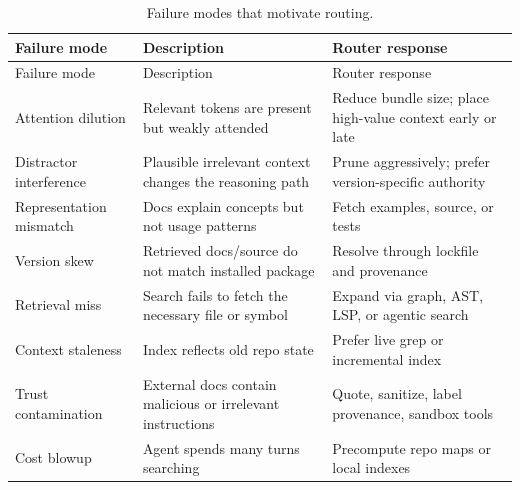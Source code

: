 \documentclass[
  11pt,
  letterpaper,
  numbers=noendperiod,
  parskip=half]{scrartcl}
\begin{document}
\begin{longtable}[]{@{}
  >{\raggedright\arraybackslash}p{}
  >{\raggedright\arraybackslash}p{}
  >{\raggedright\arraybackslash}p{}@{}}
\caption{Failure modes that motivate
routing.}\label{tbl-failure-modes}\tabularnewline
\toprule\noalign{}
\begin{minipage}[b]{\linewidth}\raggedright
Failure mode
\end{minipage} & \begin{minipage}[b]{\linewidth}\raggedright
Description
\end{minipage} & \begin{minipage}[b]{\linewidth}\raggedright
Router response
\end{minipage} \\
\midrule\noalign{}
\endfirsthead
\toprule\noalign{}
\begin{minipage}[b]{\linewidth}\raggedright
Failure mode
\end{minipage} & \begin{minipage}[b]{\linewidth}\raggedright
Description
\end{minipage} & \begin{minipage}[b]{\linewidth}\raggedright
Router response
\end{minipage} \\
\midrule\noalign{}
\endhead
\bottomrule\noalign{}
\endlastfoot
Attention dilution & Relevant tokens are present but weakly attended &
Reduce bundle size; place high-value context early or late \\
Distractor interference & Plausible irrelevant context changes the
reasoning path & Prune aggressively; prefer version-specific
authority \\
Representation mismatch & Docs explain concepts but not usage patterns &
Fetch examples, source, or tests \\
Version skew & Retrieved docs/source do not match installed package &
Resolve through lockfile and provenance \\
Retrieval miss & Search fails to fetch the necessary file or symbol &
Expand via graph, AST, LSP, or agentic search \\
Context staleness & Index reflects old repo state & Prefer live grep or
incremental index \\
Trust contamination & External docs contain malicious or irrelevant
instructions & Quote, sanitize, label provenance, sandbox tools \\
Cost blowup & Agent spends many turns searching & Precompute repo maps
or local indexes \\
\end{longtable}
\end{document}
